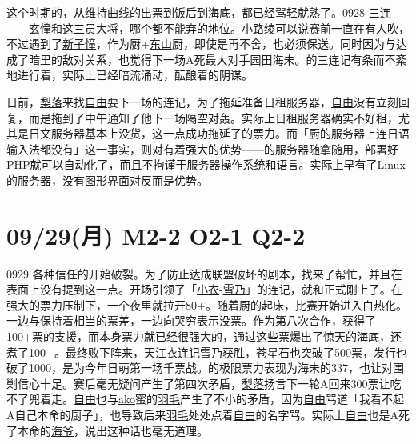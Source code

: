 这个时期的，从维持曲线的出票到饭后到海底，都已经驾轻就熟了。0928 三连——\uline{玄憧和}这三员大将，哪个都不能弃的地位。\uline{小路绫}可以说赛前一直在有人吹，不过遇到了\uline{新子憧}，作为厨+\uline{东山}厨，即使是再不舍，也必须保送。同时因为与达成了暗里的敌对关系，也觉得下一场A死最大对手园田海未。的三连记有条而不紊地进行着，实际上已经暗流涌动，酝酿着的阴谋。

日前，\uline{梨落}来找\uline{自由}要下一场的连记，为了拖延准备日租服务器，\uline{自由}没有立刻回复，而是拖到了中午通知了他下一场隔空对轰。实际上日租服务器确实不好租，尤其是日文服务器基本上没货，这一点成功拖延了的票力。而「厨的服务器上连日语输入法都没有」这一事实，则对有着强大的优势——的服务器随拿随用，部署好PHP就可以自动化了，而且不拘谨于服务器操作系统和语言。实际上早有了Linux的服务器，没有图形界面对反而是优势。

\section{09/29(月) M2-2 O2-1 Q2-2}


0929 各种信任的开始破裂。为了防止达成联盟破坏的剧本，找来了帮忙，并且在表面上没有提到这一点。开场引领了「\uline{小衣}-\uline{雪乃}」的连记，就和正式刚上了。在强大的票力压制下，一个夜里就拉开80+。随着厨的起床，比赛开始进入白热化。一边与保持着相当的票差，一边向哭穷表示没票。作为第八次合作，获得了100+票的支援，而本身票力就已经很强大的，通过这些票爆出了惊天的海底，还煮了100+。最终败下阵来，\uline{天江衣}连记\uline{雪乃}获胜，\uline{苍星石}也突破了500票，发行也破了1000，是为今年日萌第一场千票战。的极限票力表现为海未的337，也让对围剿信心十足。赛后毫无疑问产生了第四次矛盾，\uline{梨落}扬言下一轮A回来300票让吃不了兜着走。\uline{自由}也与\uline{ako}蜜的\uline{羽毛}产生了不小的矛盾，因为\uline{自由}骂道「我看不起A自己本命的厨子」，也导致后来\uline{羽毛}处处点着\uline{自由}的名字骂。实际上\uline{自由}也是A死了本命的\uline{海爷}，说出这种话也毫无道理。

